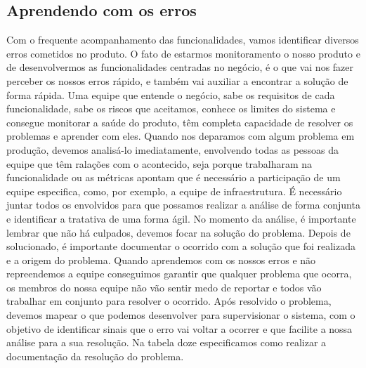     \subsection{Aprendendo com os erros}
      Com o frequente acompanhamento das funcionalidades, vamos identificar
      diversos erros cometidos no produto. O fato de estarmos monitoramento o nosso
      produto e de desenvolvermos as funcionalidades centradas no negócio, é o que
      vai nos fazer perceber os nossos erros rápido, e também vai auxiliar
      a encontrar a solução de forma rápida. Uma equipe que entende o negócio,
      sabe os requisitos de cada funcionalidade, sabe os riscos que aceitamos,
      conhece os limites do sistema e consegue monitorar a saúde do produto, têm
      completa capacidade de resolver os problemas e aprender com eles. \newline
      Quando nos deparamos com algum problema em produção, devemos analisá-lo
      imediatamente, envolvendo todas as pessoas da equipe que têm ralações com o
      acontecido, seja porque trabalharam na funcionalidade ou as métricas apontam
      que é necessário a participação de um equipe especifica, como, por exemplo, a
      equipe de infraestrutura. É necessário juntar todos os envolvidos para que
      possamos realizar a análise de forma conjunta e identificar a tratativa de
      uma forma ágil. No momento da análise, é importante lembrar que não há
      culpados, devemos focar na solução do problema. Depois de solucionado, é
      importante documentar o ocorrido com a solução que foi realizada e a origem
      do problema. Quando aprendemos com os nossos erros e não repreendemos a
      equipe conseguimos garantir que qualquer problema que ocorra, os membros do
      nossa equipe não vão sentir medo de reportar e todos vão trabalhar em conjunto
      para resolver o ocorrido. Após resolvido o problema, devemos mapear o que
      podemos desenvolver para supervisionar o sistema, com o objetivo de identificar
      sinais que o erro vai voltar a ocorrer e que facilite a nossa análise para
      a sua resolução. Na tabela doze especificamos como realizar a documentação
      da resolução do problema. \newline


